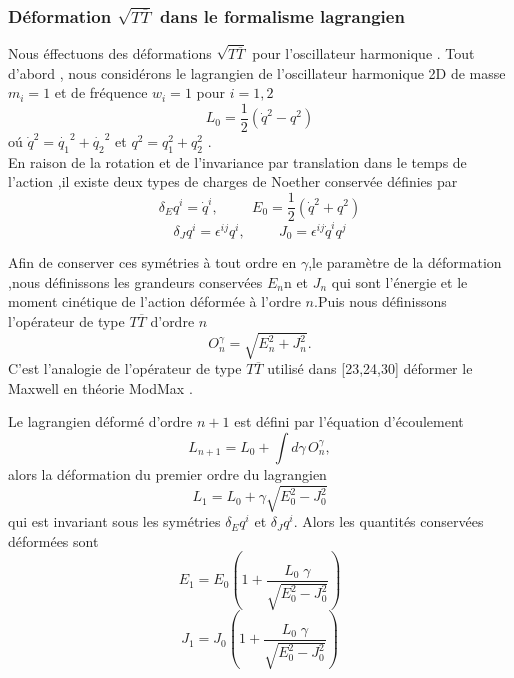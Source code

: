 \documentclass[12pt,a4paper, openany]{article}
\begin{document}
\subsubsection{Déformation $\sqrt{T{\overline{T}}}$ dans le formalisme lagrangien}

Nous éffectuons des déformations $\sqrt{T{\overline{T}}}$ pour l'oscillateur harmonique . Tout d'abord , nous considérons le lagrangien de l'oscillateur harmonique 2D de masse $m_i=1$ et de fréquence $w_i=1$ pour $i=1,2$
\begin{equation}
	L_0=\frac{1}{2}(\dot{q}^{2}-q^2)
\end{equation}
o\'{u} $\dot{q}^{2}=\dot{q_1}^{2}+\dot{q_2}^{2}$  et  $q^2=q^{2}_1+q_2^{2}$
 .\\
 En raison de la rotation et de l'invariance par translation dans le temps de l'action ,il existe deux types de charges de Noether conservée définies par 
 \begin{equation}
 \delta_{E}q^i=\dot{q}^{i},\hspace{1cm} E_0=	\frac{1}{2}(\dot{q}^{2}+q^2)
 \end{equation} 
 \begin{equation}
 	\delta_{J}q^i=\epsilon^{ij}q^i, \hspace{1cm}J_0=\epsilon^{ij}\dot{q}^{i}q^j
 \end{equation}
 
 \hspace{1cm} Afin de conserver ces symétries à tout ordre en $\gamma$,le paramètre de la déformation ,nous définissons les grandeurs conservées $E_n$n et $J_n$ qui sont l'énergie et le moment cinétique de l'action déformée à l'ordre $ n$.Puis nous définissons l'opérateur de type $T{\overline{T}}$ d'ordre $ n$ 
 \begin{equation}
 	O^{\gamma}_{n}=\sqrt{E^{2}_n+J^{2}_n} .
 \end{equation} 
 C'est l'analogie de l'opérateur de type $T{\overline{T}}$ utilisé dans [23,24,30] déformer le Maxwell en théorie ModMax .
 
 \hspace{0.5cm} Le lagrangien déformé d'ordre $n+1$ est défini par l'équation d'écoulement 
 \begin{equation}
 	L_{n+1}=L_0+\int d{\gamma}\,O^{\gamma}_{n},
 \end{equation}
 alors la déformation du premier ordre du lagrangien 
 \begin{equation}
 	L_1=L_0+\gamma\sqrt{E^{2}_0-J^{2}_0}
 \end{equation}
 qui est invariant sous les symétries $ \delta_{E}q^{i}$ et $\delta_{J}q^i$. Alors les quantités conservées déformées sont  
 \begin{equation}
 	E_1=E_0(1+\frac{L_0\;\gamma}{\sqrt{E^{2}_0-J^{2}_0}})
 \end{equation}
 \begin{equation}
 	J_1=J_0(1+\frac{L_0\;\gamma}{\sqrt{E^{2}_0-J^{2}_0}})
 \end{equation}
 
\end{document}
